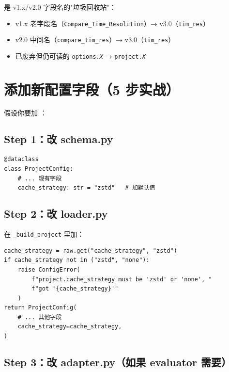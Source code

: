  是 v1.x/v2.0 字段名的"垃圾回收站"：

\begin{itemize}
  \item v1.x 老字段名（\texttt{Compare\_Time\_Resolution}）→ v3.0（\texttt{tim\_res}）
  \item v2.0 中间名（\texttt{compare\_tim\_res}）→ v3.0（\texttt{tim\_res}）
  \item 已废弃但仍可读的 \texttt{options.\textit{X}} → \texttt{project.\textit{X}}
\end{itemize}


\section{添加新配置字段（5 步实战）}

假设你要加 ：

\subsection{Step 1：改 schema.py}

\begin{verbatim}
@dataclass
class ProjectConfig:
    # ... 现有字段
    cache_strategy: str = "zstd"   # 加默认值
\end{verbatim}

\subsection{Step 2：改 loader.py}

在 \texttt{\_build\_project} 里加：

\begin{verbatim}
cache_strategy = raw.get("cache_strategy", "zstd")
if cache_strategy not in ("zstd", "none"):
    raise ConfigError(
        f"project.cache_strategy must be 'zstd' or 'none', "
        f"got '{cache_strategy}'"
    )
return ProjectConfig(
    # ... 其他字段
    cache_strategy=cache_strategy,
)
\end{verbatim}

\subsection{Step 3：改 adapter.py（如果 evaluator 需要）}

